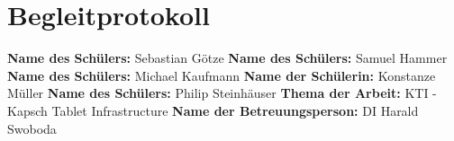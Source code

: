 \chapter{Begleitprotokoll}
\textbf{Name des Schülers:} Sebastian Götze \newline
\textbf{Name des Schülers:} Samuel Hammer \newline
\textbf{Name des Schülers:} Michael Kaufmann \newline
\textbf{Name der Schülerin:} Konstanze Müller \newline
\textbf{Name des Schülers:} Philip Steinhäuser
\newline
\newline
\textbf{Thema der Arbeit:} KTI - Kapsch Tablet Infrastructure
\newline
\newline
\textbf{Name der Betreuungsperson:} DI Harald Swoboda \newline

\newpage

